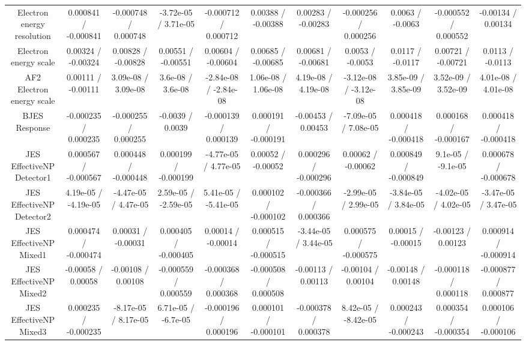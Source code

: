 \begin{table}[htbp]
\begin{center}
\begin{tabular}{|c|c|c|c|c|c|c|c|c|c|c|}
  Electron energy resolution & 0.000841 / -0.000841 & -0.000748 / 0.000748 & -3.72e-05 / 3.71e-05 & -0.000712 / 0.000712 & 0.00388 / -0.00388 & 0.00283 / -0.00283 & -0.000256 / 0.000256 & 0.0063 / -0.0063 & -0.000552 / 0.000552 & -0.00134 / 0.00134 \\ 
  Electron energy scale & 0.00324 / -0.00324 & 0.00828 / -0.00828 & 0.00551 / -0.00551 & 0.00604 / -0.00604 & 0.00685 / -0.00685 & 0.00681 / -0.00681 & 0.0053 / -0.0053 & 0.0117 / -0.0117 & 0.00721 / -0.00721 & 0.0113 / -0.0113 \\ 
  AF2 Electron energy scale & 0.00111 / -0.00111 & 3.09e-08 / 3.09e-08 & 3.6e-08 / 3.6e-08 & -2.84e-08 / -2.84e-08 & 1.06e-08 / 1.06e-08 & 4.19e-08 / 4.19e-08 & -3.12e-08 / -3.12e-08 & 3.85e-09 / 3.85e-09 & 3.52e-09 / 3.52e-09 & 4.01e-08 / 4.01e-08 \\ 
  BJES Response & -0.000235 / 0.000235 & -0.000255 / 0.000255 & -0.0039 / 0.0039 & -0.000139 / 0.000139 & 0.000191 / -0.000191 & -0.00453 / 0.00453 & -7.09e-05 / 7.08e-05 & 0.000418 / -0.000418 & 0.000168 / -0.000167 & 0.000418 / -0.000418 \\ 
  JES EffectiveNP Detector1 & 0.000567 / -0.000567 & 0.000448 / -0.000448 & 0.000199 / -0.000199 & -4.77e-05 / 4.77e-05 & 0.00052 / -0.00052 & 0.000296 / -0.000296 & 0.00062 / -0.00062 & 0.000849 / -0.000849 & 9.1e-05 / -9.1e-05 & 0.000678 / -0.000678 \\ 
  JES EffectiveNP Detector2 & 4.19e-05 / -4.19e-05 & -4.47e-05 / 4.47e-05 & 2.59e-05 / -2.59e-05 & 5.41e-05 / -5.41e-05 & 0.000102 / -0.000102 & -0.000366 / 0.000366 & -2.99e-05 / 2.99e-05 & -3.84e-05 / 3.84e-05 & -4.02e-05 / 4.02e-05 & -3.47e-05 / 3.47e-05 \\ 
  JES EffectiveNP Mixed1 & 0.000474 / -0.000474 & 0.00031 / -0.00031 & 0.000405 / -0.000405 & 0.00014 / -0.00014 & 0.000515 / -0.000515 & -3.44e-05 / 3.44e-05 & 0.000575 / -0.000575 & 0.00015 / -0.00015 & -0.00123 / 0.00123 & 0.000914 / -0.000914 \\ 
  JES EffectiveNP Mixed2 & -0.00058 / 0.00058 & -0.00108 / 0.00108 & -0.000559 / 0.000559 & -0.000368 / 0.000368 & -0.000508 / 0.000508 & -0.00113 / 0.00113 & -0.00104 / 0.00104 & -0.00148 / 0.00148 & -0.000118 / 0.000118 & -0.000877 / 0.000877 \\ 
  JES EffectiveNP Mixed3 & 0.000235 / -0.000235 & -8.17e-05 / 8.17e-05 & 6.71e-05 / -6.7e-05 & -0.000196 / 0.000196 & 0.000101 / -0.000101 & -0.000378 / 0.000378 & 8.42e-05 / -8.42e-05 & 0.000243 / -0.000243 & 0.000354 / -0.000354 & 0.000106 / -0.000106 \\ 

\end{tabular}
\end{center}
\end{table}
